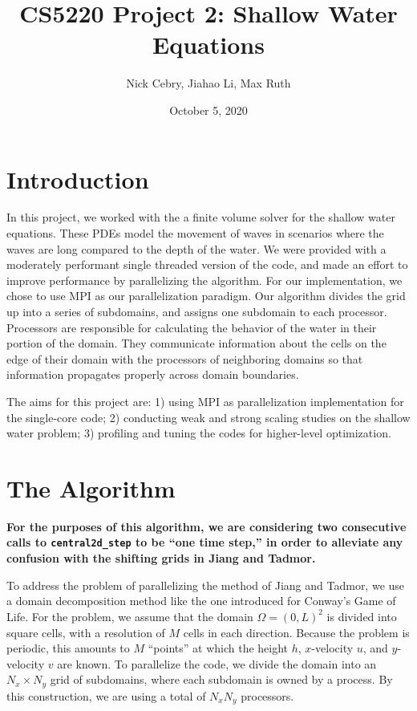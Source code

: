 \documentclass{article}
\title{CS5220 Project 2: Shallow Water Equations}
\author{Nick Cebry, Jiahao Li, Max Ruth}
\date{October 5, 2020}
\begin{document}
\maketitle

\section{Introduction}

In this project, we worked with the a finite volume solver for the shallow water equations. These PDEs model the movement of waves in scenarios where the waves are long compared to the depth of the water. We were provided with a moderately performant single threaded version of the code, and made an effort to improve performance by parallelizing the algorithm. For our implementation, we chose to use MPI as our parallelization paradigm. Our algorithm divides the grid up into a series of subdomains, and assigns one subdomain to each processor. Processors are responsible for calculating the behavior of the water in their portion of the domain. They communicate information about the cells on the edge of their domain with the processors of neighboring domains so that information propagates properly across domain boundaries.

The aims for this project are: 1) using MPI as parallelization implementation for the single-core code; 2) conducting weak and strong scaling studies on the shallow water problem; 3) profiling and tuning the codes for higher-level optimization.

\section{The Algorithm}
\textbf{For the purposes of this algorithm, we are considering two consecutive calls to \texttt{central2d\_step} to be ``one time step,'' in order to alleviate any confusion with the shifting grids in Jiang and Tadmor.}

To address the problem of parallelizing the method of Jiang and Tadmor, we use a domain decomposition method like the one introduced for Conway's Game of Life. For the problem, we assume that the domain $\Omega = (0,L)^2$ is divided into square cells, with a resolution of $M$ cells in each direction. Because the problem is periodic, this amounts to $M$ ``points'' at which the height $h$, $x$-velocity $u$, and $y$-velocity $v$ are known. To parallelize the code, we divide the domain into an $N_x\times N_y$ grid of subdomains, where each subdomain is owned by a process. By this construction, we are using a total of $N_x N_y$ processors. 
\end{document}

